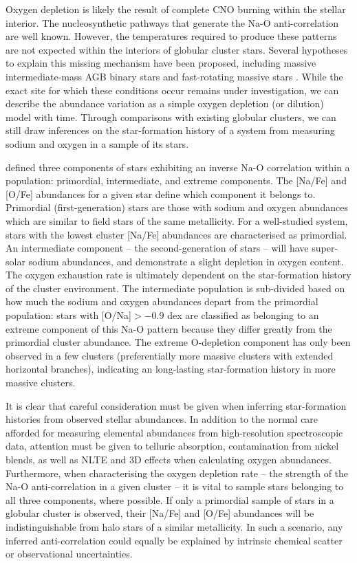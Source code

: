 \documentclass{emulateapj}
\begin{document}
Oxygen depletion is likely the result of complete CNO burning within the stellar interior. The nucleosynthetic pathways that generate the Na-O anti-correlation are well known. However, the temperatures required to produce these patterns are not expected within the interiors of globular cluster stars. Several hypotheses to explain this missing mechanism have been proposed, including massive intermediate-mass AGB binary stars \citep{de_mink;et-al_2009} and fast-rotating massive stars \citep{decressin;et-al_2007}. While the exact site for which these conditions occur remains under investigation, we can describe the abundance variation as a simple oxygen depletion (or dilution) model with time. Through comparisons with existing globular clusters, we can still draw inferences on the star-formation history of a system from measuring sodium and oxygen in a sample of its stars.

\citet{carretta;et-al_2009_na_o} defined three components of stars exhibiting an inverse Na-O correlation within a population: primordial, intermediate, and extreme components. The [Na/Fe] and [O/Fe] abundances for a given star define which component it belongs to. Primordial (first-generation) stars are those with sodium and oxygen abundances which are similar to field stars of the same metallicity. For a well-studied system, stars with the lowest cluster [Na/Fe] abundances are characterised as primordial. An intermediate component \--- the second-generation of stars \--- will have super-solar sodium abundances, and demonstrate a slight depletion in oxygen content. The oxygen exhaustion rate is ultimately dependent on the star-formation history of the cluster environment. The intermediate population is sub-divided based on how much the sodium and oxygen abundances depart from the primordial population: stars with [O/Na]$ > -0.9$ dex are classified as belonging to an extreme component of this Na-O pattern because they differ greatly from the primordial cluster abundance. The extreme O-depletion component has only been observed in a few clusters (preferentially more massive clusters with extended horizontal branches), indicating an long-lasting star-formation history in more massive clusters.

It is clear that careful consideration must be given when inferring star-formation histories from observed stellar abundances. In addition to the normal care afforded for measuring elemental abundances from high-resolution spectroscopic data, attention must be given to telluric absorption, contamination from nickel blends, as well as NLTE and 3D effects when calculating oxygen abundances. Furthermore, when characterising the oxygen depletion rate -- the strength of the Na-O anti-correlation in a given cluster -- it is vital to sample stars belonging to all three components, where possible. If only a primordial sample of stars in a globular cluster is observed, their [Na/Fe] and [O/Fe] abundances will be indistinguishable from halo stars of a similar metallicity. In such a scenario, any inferred anti-correlation could equally be explained by intrinsic chemical scatter or observational uncertainties.
\end{document}

